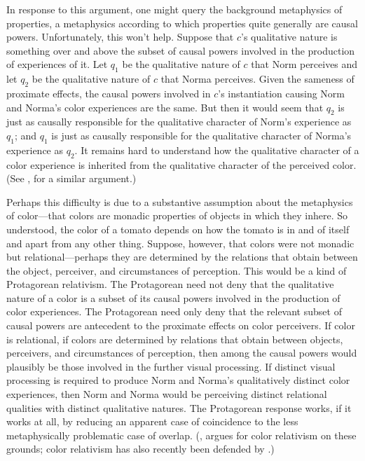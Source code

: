 \documentclass[12pt]{article}
\begin{document}
In response to this argument, one might query the background metaphysics of properties, a metaphysics according to which properties quite generally are causal powers. Unfortunately, this won't help. Suppose that $c$'s qualitative nature is something over and above the subset of causal powers involved in the production of experiences of it. Let $q_1$ be the qualitative nature of $c$ that Norm perceives and let $q_2$ be the qualitative nature of $c$ that Norma perceives. Given the sameness of proximate effects, the causal powers involved in $c$'s instantiation causing Norm and Norma's color experiences are the same. But then it would seem that $q_2$ is just as causally responsible for the qualitative character of Norm's experience as $q_1$; and $q_1$ is just as causally responsible for the qualitative character of Norma's experience as $q_2$. It remains hard to understand how the qualitative character of a color experience is inherited from the qualitative character of the perceived color. (See \citealp{Johnston:2005dq}, for a similar argument.)

Perhaps this difficulty is due to a substantive assumption about the metaphysics of color---that colors are monadic properties of objects in which they inhere. So understood, the color of a tomato depends on how the tomato is in and of itself and apart from any other thing. Suppose, however, that colors were not monadic but relational---perhaps they are determined by the relations that obtain between the object, perceiver, and circumstances of perception. This would be a kind of Protagorean relativism. The Protagorean need not deny that the qualitative nature of a color is a subset of its causal powers involved in the production of color experiences. The Protagorean need only deny that the relevant subset of causal powers are antecedent to the proximate effects on color perceivers. If color is relational, if colors are determined by relations that obtain between objects, perceivers, and circumstances of perception, then among the causal powers would plausibly be those involved in the further visual processing. If distinct visual processing is required to produce Norm and Norma's qualitatively distinct color experiences, then Norm and Norma would be perceiving distinct relational qualities with distinct qualitative natures. The Protagorean response works, if it works at all, by reducing an apparent case of coincidence to the less metaphysically problematic case of overlap. (\citealp{Johnston:2005dq}, argues for color relativism on these grounds; color relativism has also recently been defended by \citealp{Cohen:vl,McLaughlin:2003cr}.)
\end{document}
